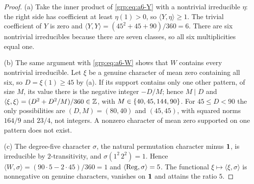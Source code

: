 
\begin{proof}
(a) Take the inner product of \eqref{grp:eq:a6-Y} with a nontrivial
irreducible $\eta$: the right side has coefficient at least $\eta(1)>0$, so
$\langle Y,\eta\rangle\ge1$. The trivial coefficient of $Y$ is zero and
$\langle Y,Y\rangle=(45^2+45+90)/360=6$. There are six nontrivial irreducibles
because there are seven classes, so all six multiplicities equal one.

(b) The same argument with \eqref{grp:eq:a6-W} shows that $W$ contains every
nontrivial irreducible. Let $\xi$ be a genuine character of mean zero
containing all six, so $D=\xi(1)\ge45$ by (a). If its support contains only
one other pattern, of size $M$, its value there is the negative integer
$-D/M$; hence $M\mid D$ and
$\langle\xi,\xi\rangle=(D^2+D^2/M)/360\in\mathbb{Z}$, with
$M\in\{40,45,144,90\}$. For $45\le D<90$ the only possibilities are
$(D,M)=(80,40)$ and $(45,45)$, with squared norms $164/9$ and $23/4$, not
integers. A nonzero character of mean zero supported on one pattern does not
exist.

(c) The degree-five character $\sigma$, the natural permutation character
minus $\mathbf{1}$, is irreducible by $2$-transitivity, and
$\sigma(1^2\,2^2)=1$. Hence
$\langle W,\sigma\rangle=(90\cdot5-2\cdot45)/360=1$ and
$\langle\operatorname{Reg},\sigma\rangle=5$. The functional
$\xi\mapsto\langle\xi,\sigma\rangle$ is nonnegative on genuine characters,
vanishes on $\mathbf{1}$ and attains the ratio $5$.
\end{proof}


